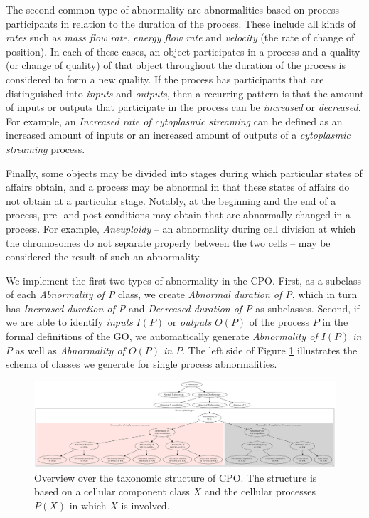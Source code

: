 \documentclass{bioinfo}
\begin{document}
The second common type of abnormality are abnormalities based on
process participants in relation to the duration of the process. These
include all kinds of {\em rates} such as {\em mass flow rate}, {\em
  energy flow rate} and {\em velocity} (the rate of change of
position). In each of these cases, an object participates in a process
and a quality (or change of quality) of that object throughout the
duration of the process is considered to form a new quality. If the
process has participants that are distinguished into {\em inputs} and
{\em outputs}, then a recurring pattern is that the amount of inputs
or outputs that participate in the process can be {\em increased} or
{\em decreased}. For example, an {\em Increased rate of cytoplasmic
  streaming} can be defined as an increased amount of inputs or an
increased amount of outputs of a {\em cytoplasmic streaming} process.

Finally, some objects may be divided into stages during which
particular states of affairs obtain, and a process may be abnormal in
that these states of affairs do not obtain at a particular
stage. Notably, at the beginning and the end of a process, pre- and
post-conditions may obtain that are abnormally changed in a
process. For example, {\em Aneuploidy} -- an abnormality during cell
division at which the chromosomes do not separate properly between the
two cells -- may be considered the result of such an abnormality.

We implement the first two types of abnormality in the CPO. First, as
a subclass of each {\em Abnormality of P} class, we create {\em
  Abnormal duration of P}, which in turn has {\em Increased duration
  of P} and {\em Decreased duration of P} as subclasses. Second, if we
are able to identify {\em inputs} $I(P)$ or {\em outputs} $O(P)$ of
the process $P$ in the formal definitions of the GO, we automatically
generate {\em Abnormality of $I(P)$ in $P$} as well as {\em
  Abnormality of $O(P)$ in $P$}.  The left side of Figure
\ref{fig:overview} illustrates the schema of classes we generate for
single process abnormalities.
\begin{figure}
  \centering
  \includegraphics[width=1\textwidth]{overview.eps}
  \caption{Overview over the taxonomic structure of CPO. The structure
    is based on a cellular component class $X$ and the cellular
    processes $P(X)$ in which $X$ is involved.\label{fig:overview}}
\end{figure}
\end{document}
